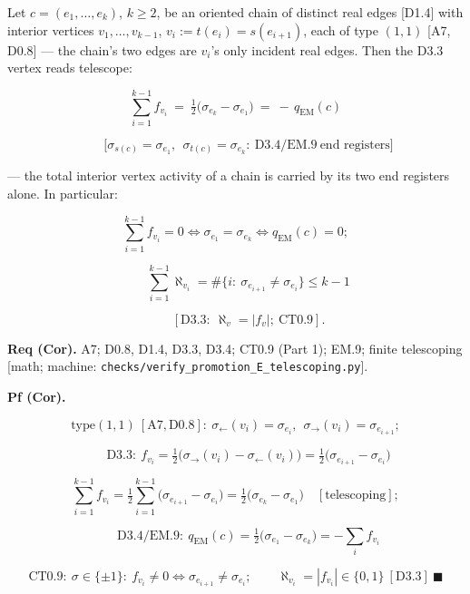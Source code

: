\begin{corollary}\label{tag:EM-9b}
Let $c=(e_1,\dots,e_k)$, $k\ge2$, be an oriented chain of distinct real edges [D1.4] with interior vertices $v_1,\dots,v_{k-1}$, $v_i:=t(e_i)=s(e_{i+1})$, each of type $(1,1)$ [A7, D0.8] — the chain's two edges are $v_i$'s only incident real edges. Then the D3.3 vertex reads telescope:

\[
\sum_{i=1}^{k-1}f_{v_i}\ =\ \tfrac12\bigl(\sigma_{e_k}-\sigma_{e_1}\bigr)\ =\ -\,q_{\mathrm{EM}}(c)
\]

\[
\qquad \bigl[\sigma_{s(c)}=\sigma_{e_1},\ \ \sigma_{t(c)}=\sigma_{e_k}:\ \mathrm{D3.4}/\mathrm{EM.9}\ \text{end registers}\bigr]
\]

— the total interior vertex activity of a chain is carried by its two end registers alone. In particular:

\[
\sum_{i=1}^{k-1}f_{v_i}=0\iff\sigma_{e_1}=\sigma_{e_k}\iff q_{\mathrm{EM}}(c)=0;
\]

\[
\qquad \sum_{i=1}^{k-1}\aleph_{v_i}=\#\{i:\ \sigma_{e_{i+1}}\ne\sigma_{e_i}\}\le k-1
\]

\[
\qquad [\mathrm{D3.3}:\ \aleph_v=|f_v|;\ \mathrm{CT0.9}].
\]

\textbf{Req (Cor).} A7; D0.8, D1.4, D3.3, D3.4; CT0.9 (Part 1); EM.9; finite telescoping [math; machine: \texttt{checks/\allowbreak{}verify\_\allowbreak{}promotion\_\allowbreak{}E\_\allowbreak{}telescoping.py}].

\textbf{Pf (Cor).}

\[
\text{type}(1,1)\ [\mathrm{A7},\mathrm{D0.8}]:\ \sigma_{\leftarrow}(v_i)=\sigma_{e_i},\ \ \sigma_{\rightarrow}(v_i)=\sigma_{e_{i+1}};
\]

\[
\qquad \mathrm{D3.3}:\ f_{v_i}=\tfrac12\bigl(\sigma_{\rightarrow}(v_i)-\sigma_{\leftarrow}(v_i)\bigr)=\tfrac12\bigl(\sigma_{e_{i+1}}-\sigma_{e_i}\bigr)
\]

\[
\sum_{i=1}^{k-1}f_{v_i}=\tfrac12\sum_{i=1}^{k-1}\bigl(\sigma_{e_{i+1}}-\sigma_{e_i}\bigr)=\tfrac12\bigl(\sigma_{e_k}-\sigma_{e_1}\bigr)\quad[\text{telescoping}];
\]

\[
\qquad \mathrm{D3.4}/\mathrm{EM.9}:\ q_{\mathrm{EM}}(c)=\tfrac12\bigl(\sigma_{e_1}-\sigma_{e_k}\bigr)=-\sum_{i}f_{v_i}
\]

\[
\mathrm{CT0.9}:\ \sigma\in\{\pm1\}:\ f_{v_i}\ne0\iff\sigma_{e_{i+1}}\ne\sigma_{e_i};\qquad\aleph_{v_i}=|f_{v_i}|\in\{0,1\}\ [\mathrm{D3.3}]\ \blacksquare
\]

\end{corollary}

